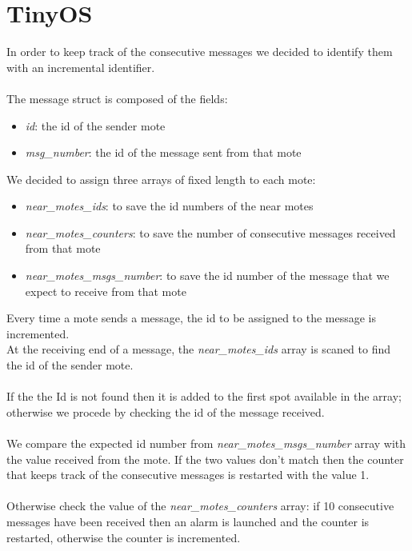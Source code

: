 \documentclass{article}
\begin{document}
\section{TinyOS}
In order to keep track of the consecutive messages we decided to identify them with an incremental identifier. \\\\
The message struct is composed of the fields:
\begin{itemize}
   \item \textit{id}: the id of the sender mote
   \item \textit{msg\_number}: the id of the message sent from that mote
\end{itemize}
We decided to assign three arrays of fixed length to each mote:
\begin{itemize}
   \item \textit{near\_motes\_ids}: to save the id numbers of the near motes
   \item \textit{near\_motes\_counters}: to save the number of consecutive messages received from that mote
   \item \textit{near\_motes\_msgs\_number}: to save the id number of the message that we expect to receive from that mote
\end{itemize}
Every time a mote sends a message, the id to be assigned to the message is incremented.\\
At the receiving end of a message, the \textit{near\_motes\_ids} array is scaned to find the id of the sender mote.\\\\
If the the Id is not found then it is added to the first spot available in the array; otherwise we procede by checking the id of the message received.\\\\
We compare the expected id number from \textit{near\_motes\_msgs\_number} array with the value received from the mote. If the two values don't match then the counter that keeps track of the consecutive messages is restarted with the value 1.\\\\
Otherwise check the value of the \textit{near\_motes\_counters} array: if 10 consecutive messages have been received then an alarm is launched and the counter is restarted, otherwise the counter is incremented.
\end{document}
